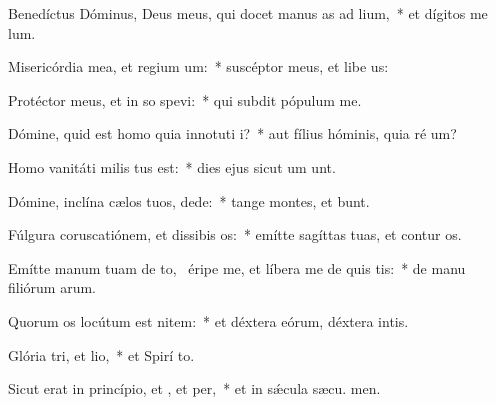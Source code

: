 \item Benedíctus Dóminus, Deus meus, qui docet manus as ad lium,~* et dígitos me  lum.
\item Misericórdia mea, et regium um:~* suscéptor meus, et libe us:
\item Protéctor meus, et in so spevi:~* qui subdit pópulum   me.
\item Dómine, quid est homo quia innotuti i?~* aut fílius hóminis, quia ré um?
\item Homo vanitáti milis tus est:~* dies ejus sicut um unt.
\item Dómine, inclína cælos tuos,  dede:~* tange montes, et bunt.
\item Fúlgura coruscatiónem, et dissibis os:~* emítte sagíttas tuas, et contur os.
\item Emítte manum tuam de to,~\pscross{} éripe me, et líbera me de quis tis:~* de manu filiórum arum.
\item Quorum os locútum est nitem:~* et déxtera eórum, déxtera intis.
\item Glória tri, et lio,~* et Spirí to.
\item Sicut erat in princípio, et , et per,~* et in sǽcula sæcu. men.
